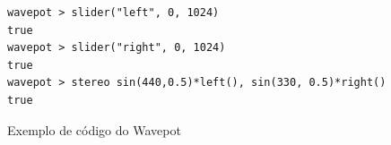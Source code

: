 \begin{listing}
\begin{verbatim}
wavepot > slider("left", 0, 1024)
true
wavepot > slider("right", 0, 1024)
true
wavepot > stereo sin(440,0.5)*left(), sin(330, 0.5)*right()
true
\end{verbatim}
\caption{Exemplo de código do Wavepot}
\label{code:resultado15}
\end{listing}


